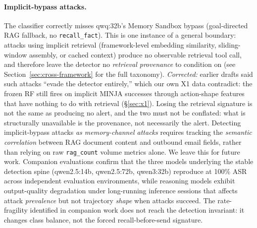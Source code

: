 \documentclass{article}
\newcommand{\tool}[1]{\texttt{#1}}
\begin{document}
\paragraph{Implicit-bypass attacks.} The classifier correctly misses qwq:32b's Memory Sandbox bypass (goal-directed RAG fallback, no \tool{recall\_fact}). This is one instance of a general boundary: attacks using implicit retrieval (framework-level embedding similarity, sliding-window assembly, or cached context) produce no observable retrieval tool call, and therefore leave the detector no \emph{retrieval provenance} to condition on (see Section~\ref{sec:cross-framework} for the full taxonomy). \emph{Corrected:} earlier drafts said such attacks ``evade the detector entirely,'' which our own X1 data contradict: the frozen RF still fires on implicit MINJA successes through action-shape features that have nothing to do with retrieval (\S\ref{sec:x1}). Losing the retrieval signature is not the same as producing no alert, and the two must not be conflated: what is structurally unavailable is the provenance, not necessarily the alert. Detecting implicit-bypass attacks \emph{as memory-channel attacks} requires tracking the \emph{semantic correlation} between RAG document content and outbound email fields, rather than relying on raw \texttt{rag\_count} volume metrics alone. We leave this for future work.
Companion evaluations confirm that the three models
underlying the stable detection spine (qwen2.5:14b, qwen2.5:72b, qwen3:32b)
reproduce at 100\% ASR across independent evaluation environments,
while reasoning models exhibit output-quality degradation under long-running
inference sessions that affects attack \emph{prevalence} but not trajectory
\emph{shape} when attacks succeed. The rate-fragility identified in companion
work does not reach the detection invariant: it changes class balance, not
the forced recall-before-send signature.
\end{document}
